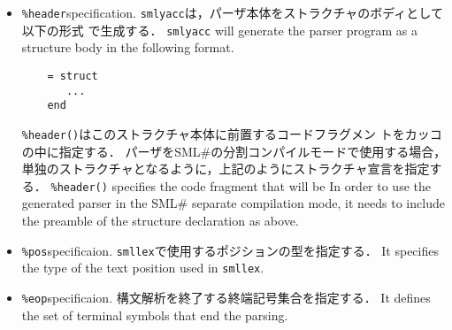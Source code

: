 \documentclass{jbook}
\newcommand{\txt}[2]{#2}
\newcommand{\smlsharp}{SML\#}
\newcommand{\code}[1]{\mbox{\large\tt #1}}
\begin{document}
\begin{enumerate}
\begin{itemize}
\item \verb|%header|\txt{指定}{specification}.
\ifjp%
	\code{smlyacc}は，パーザ本体をストラクチャのボディとして以下の形式
で生成する．
\else%
	\code{smlyacc} will generate the parser program as a structure
body in the following format.
\fi%
\begin{verbatim}
    = struct
       ...
    end
\end{verbatim}
\ifjp%
	\verb|%header()|はこのストラクチャ本体に前置するコードフラグメン
トをカッコの中に指定する．
	パーザを\smlsharp{}の分割コンパイルモードで使用する場合，
単独のストラクチャとなるように，上記のようにストラクチャ宣言を指定する．
\else%
	\verb|%header()| specifies the code fragment that will be
	In order to use the generated parser in the \smlsharp{} separate
compilation mode, it needs to include the preamble of the structure
declaration as above.
\fi%

\item \verb|%pos|\txt{指定}{specificaion}.
\ifjp%
	\code{smllex}で使用するポジションの型を指定する．
\else%
	It specifies the type of the text position used in \code{smllex}.
\fi%

\item \verb|%eop|\txt{指定}{specificaion}.
\ifjp%
	構文解析を終了する終端記号集合を指定する．
\else%
	It defines the set of terminal symbols that end the parsing.
\fi%


\end{itemize}
\end{enumerate}
\end{document}
